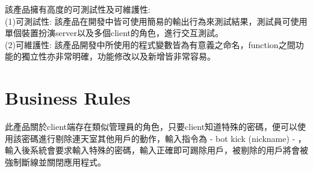 \documentclass{scrreprt}
\begin{document}
\begin{CJK}{UTF8}{bkai}
該產品擁有高度的可測試性及可維護性: \\
(1)可測試性: 該產品在開發中皆可使用簡易的輸出行為來測試結果，測試員可使用單個裝置扮演server以及多個client的角色，進行交互測試。\\
(2)可維護性: 該產品開發中所使用的程式變數皆為有意義之命名，function之間功能的獨立性亦非常明確，功能修改以及新增皆非常容易。\\

\section{Business Rules}
此產品關於client端存在類似管理員的角色，只要client知道特殊的密碼，便可以使用該密碼進行剔除連天室其他用戶的動作，輸入指令為 - bot kick (nickname) - ，輸入後系統會要求輸入特殊的密碼，輸入正確即可踢除用戶，被剔除的用戶將會被強制斷線並關閉應用程式。




\end{CJK}
\end{document}
